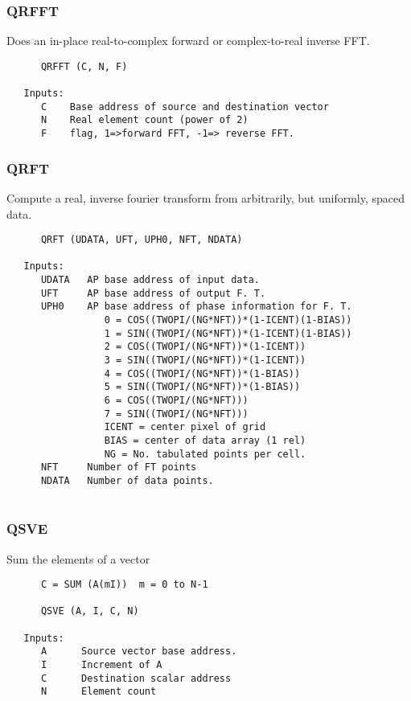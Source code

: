 \subsubsection{QRFFT }
Does an in-place real-to-complex forward or complex-to-real inverse
FFT.

\begin{verbatim}
      QRFFT (C, N, F)

   Inputs:
      C    Base address of source and destination vector
      N    Real element count (power of 2)
      F    flag, 1=>forward FFT, -1=> reverse FFT.

\end{verbatim}
\subsubsection{QRFT }
Compute a real, inverse fourier transform from arbitrarily, but
uniformly, spaced data.

\begin{verbatim}
      QRFT (UDATA, UFT, UPH0, NFT, NDATA)

   Inputs:
      UDATA   AP base address of input data.
      UFT     AP base address of output F. T.
      UPH0    AP base address of phase information for F. T.
                 0 = COS((TWOPI/(NG*NFT))*(1-ICENT)(1-BIAS))
                 1 = SIN((TWOPI/(NG*NFT))*(1-ICENT)(1-BIAS))
                 2 = COS((TWOPI/(NG*NFT))*(1-ICENT))
                 3 = SIN((TWOPI/(NG*NFT))*(1-ICENT))
                 4 = COS((TWOPI/(NG*NFT))*(1-BIAS))
                 5 = SIN((TWOPI/(NG*NFT))*(1-BIAS))
                 6 = COS((TWOPI/(NG*NFT)))
                 7 = SIN((TWOPI/(NG*NFT)))
                 ICENT = center pixel of grid
                 BIAS = center of data array (1 rel)
                 NG = No. tabulated points per cell.
      NFT     Number of FT points
      NDATA   Number of data points.
 

\end{verbatim}
\subsubsection{QSVE }
Sum the elements of a vector

\begin{verbatim}
      C = SUM (A(mI))  m = 0 to N-1

      QSVE (A, I, C, N)

   Inputs:
      A      Source vector base address.
      I      Increment of A
      C      Destination scalar address
      N      Element count

\end{verbatim}
